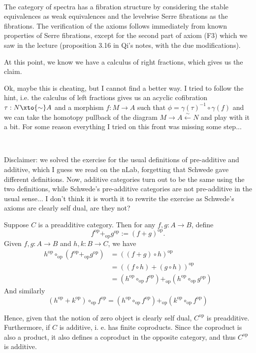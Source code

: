 
\def\op{\text{op}}


\mmaketitle

\begin{exercise}[1]\ 

The category of spectra has a fibration structure by considering the stable equivalences as weak equivalences and the levelwise Serre fibrations as the fibrations. The verification of the axioms follows immediately from known properties of Serre fibrations, except for the second part of axiom (F3) which we saw in the lecture (proposition 3.16 in Qi's notes, with the due modifications).

At this point, we know we have a calculus of right fractions, which gives us the claim.

Ok, maybe this is cheating, but I cannot find a better way. I tried to follow the hint, i.e. the calculus of left fractions gives us an acyclic cofibration $\tau:N\xto{\sim} A$ and a morphism $f:M\to A$ such that $\phi=\gamma(\tau)^{-1}\circ\gamma(f)$ and we can take the homotopy pullback of the diagram $M\to A\xleftarrow{\sim}N$ and play with it a bit. For some reason everything I tried on this front was missing some step...
\end{exercise}


\begin{exercise}[2]\ 

Disclaimer: we solved the exercise for the usual definitions of pre-additive and additive, which I guess we read on the nLab, forgetting that Schwede gave different definitions. Now, additive categories turn out to be the same using the two definitions, while Schwede's pre-additive categories are not pre-additive in the usual sense... I don't think it is worth it to rewrite the exercise as Schwede's axioms are clearly self dual, are they not?

Suppose $C$ is a preadditive category. Then 
for any $f,g : A \to B$, define
\[ f^\op +_\op g^\op := (f + g)^\op. \]
Given $f,g : A \to B$ and $h,k : B \to C$, we have
\begin{align*}
h^\op \circ_\op (f^\op +_\op g^\op)  
&= ((f+g)\circ h)^\op \\
&= ((f\circ h) + (g\circ h))^\op \\
&= (h^\op \circ_\op f^\op) +_\op (h^\op \circ_\op g^\op)
\end{align*}
And similarly 
\[ (h^\op + k^\op) \circ_\op f^\op = (h^\op \circ_\op f^\op) +_\op (k^\op \circ_\op
f^\op) \]

Hence, given that the notion of zero object is clearly self dual, $C^\op$ is preadditive. 
Furthermore, if $C$ is additive, i. e. has finite coproducts. 
Since the coproduct is also a product, it also defines a coproduct in the
opposite category, and thus $C^\op$ is additive.
\end{exercise}


